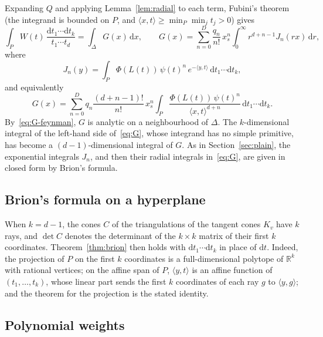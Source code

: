\documentclass[11pt]{article}
\theoremstyle{remark}
\newcommand{\R}{\mathbb{R}}
\newcommand{\scal}[2]{\langle #1, #2\rangle}
\newcommand{\dd}{\mathrm{d}}
\begin{document}
Expanding $Q$ and applying Lemma~\ref{lem:radial} to each term, Fubini's
theorem (the integrand is bounded on $P$, and $\scal{x}{t} \geq \min_{P}
\min_j t_j > 0$) gives
\begin{equation}\label{eq:G}
  \int_P W(t) \, \frac{\dd t_1 \cdots \dd t_k}{t_1 \cdots t_d}
  = \int_\Delta G(x) \, \dd x,
  \qquad
  G(x) = \sum_{n=0}^{D} \frac{q_n}{n!} \, x_s^n \int_0^\infty r^{d+n-1}
    J_n(r x) \, \dd r,
\end{equation}
where
\[
  J_n(y) = \int_P \Phi(L(t)) \, \psi(t)^n \, e^{-\scal{y}{t}} \,
  \dd t_1 \cdots \dd t_k,
\]
and equivalently
\begin{equation}\label{eq:G-feynman}
  G(x) = \sum_{n=0}^{D} q_n \frac{(d+n-1)!}{n!} \, x_s^n \int_P
    \frac{\Phi(L(t)) \, \psi(t)^n}{\scal{x}{t}^{d+n}} \,
    \dd t_1 \cdots \dd t_k.
\end{equation}
By~\eqref{eq:G-feynman}, $G$ is analytic on a neighbourhood of $\Delta$.
The $k$-dimensional integral of the left-hand side of~\eqref{eq:G}, whose
integrand has no simple primitive, has become a $(d-1)$-dimensional
integral of $G$. As in Section~\ref{sec:plain}, the exponential integrals
$J_n$, and then their radial integrals in~\eqref{eq:G}, are given in closed
form by Brion's formula.

\subsection{Brion's formula on a hyperplane}

When $k = d - 1$, the cones $C$ of the triangulations of the tangent cones
$K_v$ have $k$ rays, and $\det C$ denotes the determinant of the $k \times
k$ matrix of their first $k$ coordinates. Theorem~\ref{thm:brion} then holds
with $\dd t_1 \cdots \dd t_k$ in place of $\dd t$. Indeed, the projection of
$P$ on the first $k$ coordinates is a full-dimensional polytope of $\R^k$
with rational vertices; on the affine span of $P$, $\scal{y}{t}$ is an
affine function of $(t_1, \ldots, t_k)$, whose linear part sends the first
$k$ coordinates of each ray $g$ to $\scal{y}{g}$; and the theorem for the
projection is the stated identity.

\subsection{Polynomial weights}
\end{document}
